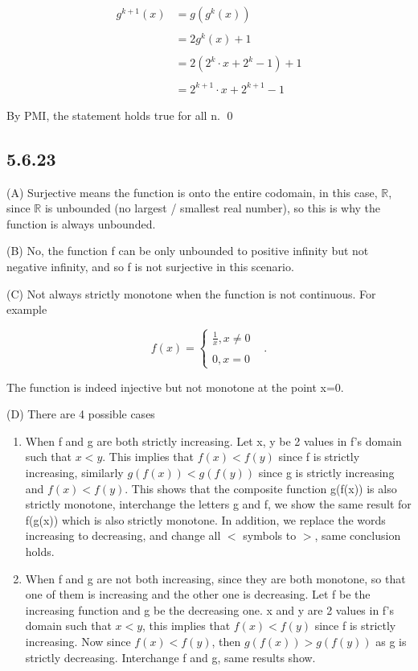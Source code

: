 \documentclass{article}
\begin{document}
$$\begin{aligned}g^{k+1}(x)&=g\left(g^k(x)\right)\\\\&=2g^k(x)+1\\\\&=2\left(2^k\cdot x+2^k-1\right)+1\\\\&=2^{k+1}\cdot x+2^{k+1}-1\end{aligned}$$

By PMI, the statement holds true for all n. \qed

\subsection*{5.6.23}

(A) Surjective means the function is onto the entire codomain, in this case, $\mathbb{R}$, since $\mathbb{R}$ is unbounded (no largest / smallest real number), so this is why the function is always unbounded. 

(B) No, the function f can be only unbounded to positive infinity but not negative infinity, and so f is not surjective in this scenario.

(C) Not always strictly monotone when the function is not continuous. For example 

$$f(x)=\begin{cases}\frac1x,x\neq0\\\\0,x=0&\end{cases}.$$

The function is indeed injective but not monotone at the point x=0.

(D) There are 4 possible cases

\begin{enumerate}
    \item When f and g are both strictly increasing. Let x, y be 2 values in f's domain such that $x<y$. This implies that $f(x)<f(y)$ since f is strictly increasing, similarly $g(f(x))<g(f(y))$ since g is strictly increasing and $f(x)<f(y)$. This shows that the composite function g(f(x)) is also strictly monotone, interchange the letters g and f, we show the same result for f(g(x)) which is also strictly monotone. In addition, we replace the words increasing to decreasing, and change all $<$ symbols to $>$, same conclusion holds.
    \item When f and g are not both increasing, since they are both monotone, so that one of them is increasing and the other one is decreasing. Let f be the increasing function and g be the decreasing one. x and y are 2 values in f's domain such that $x<y$, this implies that $f(x)<f(y)$ since f is strictly increasing. Now since $f(x)<f(y)$, then $g(f(x))>g(f(y))$ as g is strictly decreasing. Interchange f and g, same results show.
\end{enumerate}
\end{document}
